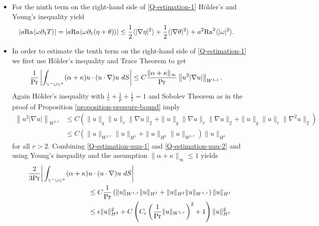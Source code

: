 \documentclass{article}
\theoremstyle{definition}
\theoremstyle{definition}
\newcommand{\Pra}{\rm{Pr}}
\newcommand{\Ra}{{\rm{Ra}}}
\begin{document}
\begin{itemize}
    \item
    For the ninth term on the right-hand side of \eqref{Q-estimation-1} Hölder's and Young's inequality yield
    \begin{align*}
        |a\Ra \langle \omega\partial_1 T\rangle| &= |a\Ra \langle \omega\partial_1 (\eta+\theta)\rangle| \leq \frac{1}{2} \langle|\nabla \eta|^2\rangle + \frac{1}{2} \langle|\nabla \theta|^2\rangle + a^2 \Ra^2 \langle |\omega|^2\rangle.
    \end{align*}
    \item
    In order to estimate the tenth term on the right-hand side of \eqref{Q-estimation-1} we first use Hölder's inequality and Trace Theorem to get
    \begin{align}
        \label{Q-estimation-uuu-1}
        \frac{1}{\Pra}&\left|\int_{\gamma^-\cup\gamma^+} (\alpha+\kappa) u\cdot(u\cdot \nabla)u \ dS\right| 
        \leq C\frac{\|\alpha+\kappa\|_\infty}{\Pra} \left\|u^2 |\nabla u|\right\|_{W^{1,1}} .
    \end{align}
    Again Hölder's inequality with $\frac{1}{r}+\frac{1}{p}+\frac{1}{2}=1$ and Sobolev Theorem as in the proof of Proposition \ref{proposition-pressure-bound} imply
    \begin{equation}
        \label{Q-estimation-uuu-2}
        \begin{aligned}
            \left\|u^2 |\nabla u|\right\|_{W^{1,1}} &\leq C\left(\|u\|_q\|u\|_r \|\nabla u\|_2 + \|u\|_q\|\nabla u\|_r \|\nabla u\|_2+\|u\|_q\|u\|_r \|\nabla^2 u\|_2 \right) 
            \\
            &\leq C \left(\|u\|_{W^{1,r}}\|u\|_{H^1}+\| u\|_{H^2}\|u\|_{W^{1,r}}\right)\|u\|_{H^1}
        \end{aligned}
    \end{equation}
    for all $r>2$. Combining \eqref{Q-estimation-uuu-1} and \eqref{Q-estimation-uuu-2} and using Young's inequality and the assumption $\|\alpha+\kappa\|_\infty\leq 1$ yields
    \begin{equation}
        \label{Q-estimation-uuu-3}
        \begin{aligned}
            \frac{2}{3\Pra}\bigg|\int_{\gamma^-\cup\gamma^+} (\alpha+\kappa) &u\cdot(u\cdot \nabla)u \ dS\bigg| 
            \\
            &\leq C\frac{1}{\Pra} \left(\|u\|_{W^{1,r}}\|u\|_{H^1}+\| u\|_{H^2}\|u\|_{W^{1,r}}\right)\|u\|_{H^1}
            \\ 
            &\leq \epsilon \|u\|_{H^2}^2 + C\left( C_\epsilon\left(\frac{1}{\Pra} \|u\|_{W^{1,r}}\right)^2+1\right) \|u\|_{H^1}^2

\end{aligned}
\end{equation}
\end{itemize}
\end{document}

